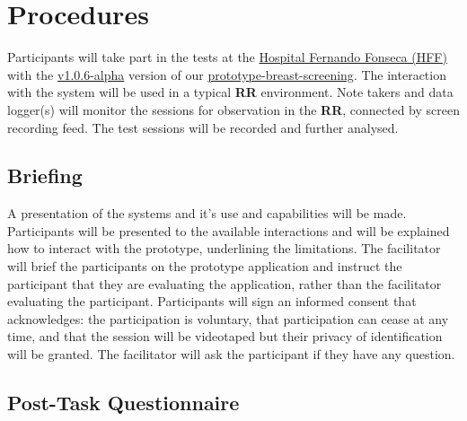 \section{Procedures}

Participants will take part in the tests at the \hyperlink{http://hff.min-saude.pt/}{Hospital Fernando Fonseca (HFF)} with the \hyperlink{https://github.com/MIMBCD-UI/prototype-breast-screening/releases/tag/v1.0.6-alpha}{v1.0.6-alpha} version of our \hyperlink{https://github.com/MIMBCD-UI/prototype-breast-screening/}{prototype-breast-screening}. The interaction with the system will be used in a typical \textbf{RR} environment. Note takers and data logger(s) will monitor the sessions for observation in the \textbf{RR}, connected by screen recording feed. The test sessions will be recorded and further analysed.


\subsection{Briefing}

A presentation of the systems and it's use and capabilities will be made. Participants will be presented to the available interactions and will be explained how to interact with the prototype, underlining the limitations. The facilitator will brief the participants on the prototype application and instruct the participant that they are evaluating the application, rather than the facilitator evaluating the participant. Participants will sign an informed consent that acknowledges: the participation is voluntary, that participation can cease at any time, and that the session will be videotaped but their privacy of identification will be granted. The facilitator will ask the participant if they have any question.



\subsection{Post-Task Questionnaire}

